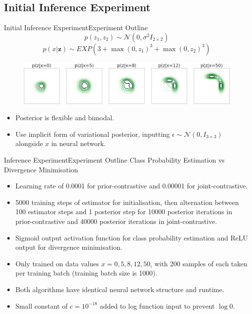 \documentclass{beamer}
\begin{document}
\subsection{Initial Inference Experiment}
\begin{frame}{Initial Inference Experiment}{Experiment Outline}
\[p(z_1,z_2)\sim \mathcal{N} (0,\sigma^2 I_{2\times 2})\]
\[p(x|\bm{z})\sim EXP(3+\max(0,z_1)^3+\max(0,z_2)^3)\]
\begin{figure}[h]
\includegraphics[width=\textwidth]{sprinklertrue.png}
\end{figure}
\begin{itemize}
\item Posterior is flexible and bimodal.
\item Use implicit form of variational posterior, inputting $\epsilon\sim\mathcal{N}(0,I_{3\times 3})$ alongside $x$ in neural network.
\end{itemize}
\end{frame}
\begin{frame}{Inference Experiment}{Experiment Outline}
Class Probability Estimation vs Divergence Minimisation
\begin{itemize}
\item Learning rate of 0.0001 for prior-contrastive and 0.00001 for joint-contrastive.
\item 5000 training steps of estimator for initialisation, then alternation between 100 estimator steps and 1 posterior step for 10000 posterior iterations in prior-contrastive and 40000 posterior iterations in joint-contrastive.
\item Sigmoid output activation function for class probability estimation and ReLU output for divergence minimisation.
\item Only trained on data values $x=0,5,8,12,50$, with 200 samples of each taken per training batch (training batch size is 1000).
\item Both algorithms have identical neural network structure and runtime.
\item Small constant of $c=10^{-18}$ added to log function input to prevent $\log 0$.
\end{itemize}
\end{frame}
\end{document}
